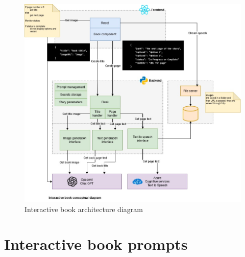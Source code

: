 \documentclass[conference]{IEEEtran}
\begin{document}
	\begin{figure}[H]
		\centering
		\includegraphics[width=0.9\linewidth]{"img/img-ARI3333-project-conceptual-diagram (1)"}
		\caption{Interactive book architecture diagram}
		\label{fig:img-ari3333-project-conceptual-diagram-1}
	\end{figure}

\pagebreak
\section{Interactive book prompts}
\end{document}
